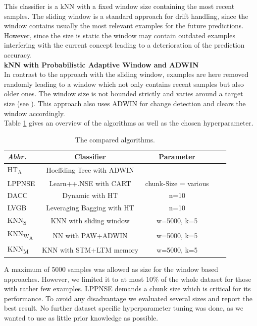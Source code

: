 \documentclass[conference]{IEEEtran}
\begin{document}
This classifier is a kNN with a fixed window size containing the most recent samples. The sliding window is a standard approach for drift handling, since the window contains usually the most relevant examples
for the future predictions. However, since the size is static the window may contain outdated examples interfering with the current concept leading to a deterioration of the prediction accuracy. 
\\\textbf{kNN with Probabilistic Adaptive Window and ADWIN}\\
In contrast to the approach with the sliding window, examples are here removed randomly leading to a window which not only contains recent samples but also older ones. The window size is not bounded strictly
and varies around a target size (see \cite{Bifet:2013:EDS:2480362.2480516}). This approach also uses ADWIN for change detection and clears the window accordingly. \\
Table \ref{tab:algorithms} gives an overview of the algorithms as well as the chosen hyperparameter. 
\begin{table}
\def\arraystretch{0.9}
\footnotesize
\centering
\caption{The compared algorithms.}
\label{tab:algorithms}
\begin{tabular}{l|cccc}
\textit{Abbr.} & Classifier & Parameter\\\hline
HT\textsubscript{A} & Hoeffding Tree with ADWIN \\
LPPNSE & Learn++.NSE with CART& chunk-Size = various\\
DACC & Dynamic with HT& n=10\\
LVGB & Leveraging Bagging with HT& n=10\\
KNN\textsubscript{S} & KNN with sliding window & w=5000, k=5\\
KNN\textsubscript{W\textsubscript{A}} & NN with PAW+ADWIN& w=5000, k=5\\
KNN\textsubscript{M} &KNN with STM+LTM memory & w=5000, k=5\\
\end{tabular}
\end{table}
A maximum of 5000 samples was allowed as size for the window based approaches. However,
we limited it to at most 10\% of the whole dataset for those with rather few examples. LPPNSE demands a chunk size which is critical for its performance. To avoid any disadvantage 
we evaluated several sizes and report the best result. No further dataset specific hyperparameter tuning was done, as we wanted to use as little prior knowledge as possible.
\end{document}
